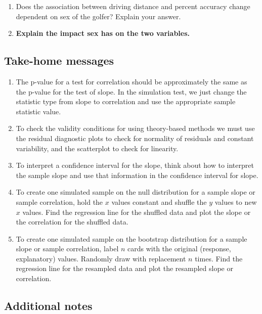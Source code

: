 \documentclass[
]{report}
\begin{document}
\begin{enumerate}
\def\labelenumi{\arabic{enumi}.}
\setcounter{enumi}{14}
\item
  Does the association between driving distance and percent accuracy change dependent on sex of the golfer? Explain your answer.
  \vspace{1in}
\item
  \textbf{Explain the impact sex has on the two variables.}
  \vspace{1in}
\end{enumerate}

\hypertarget{take-home-messages-19}{%
\subsection{Take-home messages}\label{take-home-messages-19}}

\begin{enumerate}
\def\labelenumi{\arabic{enumi}.}
\item
  The p-value for a test for correlation should be approximately the same as the p-value for the test of slope. In the simulation test, we just change the statistic type from slope to correlation and use the appropriate sample statistic value.
\item
  To check the validity conditions for using theory-based methods we must use the residual diagnostic plots to check for normality of residuals and constant variability, and the scatterplot to check for linearity.
\item
  To interpret a confidence interval for the slope, think about how to interpret the sample slope and use that information in the confidence interval for slope.
\item
  To create one simulated sample on the null distribution for a sample slope or sample correlation, hold the \(x\) values constant and shuffle the \(y\) values to new \(x\) values. Find the regression line for the shuffled data and plot the slope or the correlation for the shuffled data.
\item
  To create one simulated sample on the bootstrap distribution for a sample slope or sample correlation, label \(n\) cards with the original (response, explanatory) values. Randomly draw with replacement \(n\) times. Find the regression line for the resampled data and plot the resampled slope or correlation.
\end{enumerate}

\hypertarget{additional-notes-19}{%
\subsection{Additional notes}\label{additional-notes-19}}
\end{document}
